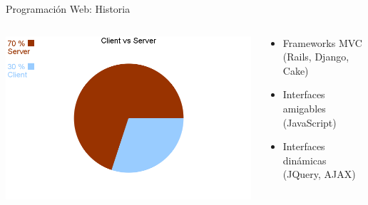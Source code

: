 \documentclass[xcolor=dvipsnames, 14pt]{beamer}
\begin{document}
\begin{frame}{Programación Web: Historia}
    \begin{columns}
        \begin{column}{0.5\textwidth}
            \begin{center}
                \includegraphics[width=\textwidth]{img/historia.png}
            \end{center}
        \end{column}
        \begin{column}{0.5\textwidth}
            \begin{itemize}
                \item Frameworks MVC (Rails, Django, Cake)
                \item Interfaces amigables (JavaScript)
                \item Interfaces dinámicas (JQuery, AJAX)
            \end{itemize}
        \end{column}
    \end{columns}

\end{frame}
\end{document}
